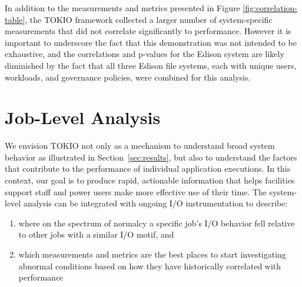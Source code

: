 In addition to the measurements and metrics presented in Figure \ref{fig:correlation-table}, the TOKIO framework collected a larger number of system-specific measurements that did not correlate significantly to performance.
However it is important to underscore the fact that this demonstration was not intended to be exhaustive, and the correlations and p-values for the Edison system are likely diminished by the fact that all three Edison file systems, each with unique users, workloads, and governance policies, were combined for this analysis.

\section{Job-Level Analysis} \label{sec:results/umami}

We envision TOKIO not only as a mechanism to understand broad system behavior as illustrated in Section~\ref{sec:results}, but also to understand the factors that contribute to the performance of individual application executions.
In this context, our goal is to produce rapid, actionable information that helps facilities support staff and power users make more effective use of their time.
The system-level analysis can be integrated with ongoing I/O instrumentation to describe:

\begin{enumerate}
\item where on the spectrum of normalcy a specific job's I/O behavior fell relative to other jobs with a similar I/O motif, and
\item which measurements and metrics are the best places to start investigating abnormal conditions based on how they have historically correlated with performance
\end{enumerate}

